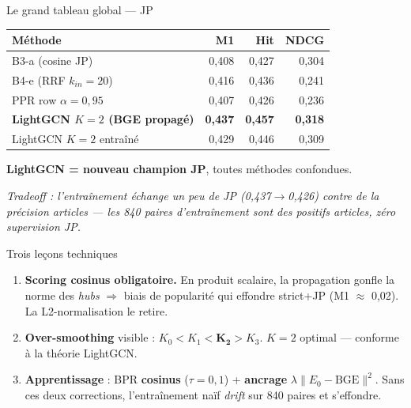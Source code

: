\documentclass[aspectratio=169,10pt]{beamer}
\newcommand{\okbox}[1]{\begin{center}\colorbox{green!10}{\parbox{0.92\linewidth}{\centering #1}}\end{center}}
\begin{document}
\begin{frame}{Le grand tableau global — JP}
  \scriptsize
  \renewcommand{\arraystretch}{1.2}
  \setlength{\tabcolsep}{7pt}
  \begin{center}
  \begin{tabular}{@{}l r r r@{}}
    \toprule
    \textbf{Méthode} & M1 & Hit & NDCG \\
    \midrule
    B3-a (cosine JP)              & 0,408 & 0,427 & 0,304 \\
    B4-e (RRF $k_{in}{=}20$)      & 0,416 & 0,436 & 0,241 \\
    PPR row $\alpha{=}0{,}95$     & 0,407 & 0,426 & 0,236 \\
    \rowcolor{accentsoft} \textbf{LightGCN $K{=}2$ (BGE propagé)} & \textbf{0,437} & \textbf{0,457} & \textbf{0,318} \\
    \rowcolor{accentsoft} LightGCN $K{=}2$ entraîné & 0,429 & 0,446 & 0,309 \\
    \bottomrule
  \end{tabular}
  \end{center}
  \okbox{\textbf{LightGCN = nouveau champion JP}, toutes méthodes confondues.}

  \footnotesize
  \vspace{0.3em}
  \textit{Tradeoff : l'entraînement échange un peu de JP (0,437$\to$0,426) contre de la précision articles —
  les 840 paires d'entraînement sont des positifs \emph{articles}, zéro supervision JP.}
\end{frame}

\begin{frame}{Trois leçons techniques}
  \begin{enumerate}
    \item \textbf{Scoring cosinus obligatoire.} En produit scalaire, la propagation gonfle la norme des \emph{hubs} $\Rightarrow$ biais de popularité qui effondre strict+JP (M1 $\approx$ 0,02). La L2-normalisation le retire.
    \medskip
    \item \textbf{Over-smoothing} visible : $K_0 < K_1 < \mathbf{K_2} > K_3$. $K{=}2$ optimal — conforme à la théorie LightGCN.
    \medskip
    \item \textbf{Apprentissage} : BPR \textbf{cosinus} ($\tau{=}0{,}1$) + \textbf{ancrage} $\lambda\lVert E_0 - \mathrm{BGE}\rVert^2$. Sans ces deux corrections, l'entraînement naïf \emph{drift} sur 840 paires et s'effondre.
  \end{enumerate}
\end{frame}
\end{document}
